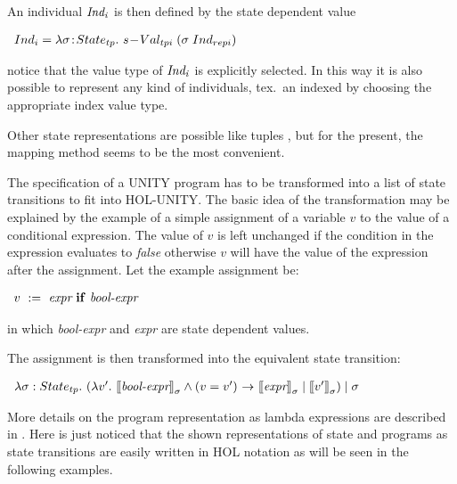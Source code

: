 An individual ${\it Ind_i}$ is then defined by the state dependent value

\vspace{2mm}
\centerline{\hbox{$ \it \begin{array}{l}
  Ind_i = \lambda \sigma\!:\!State_{tp}.\ s\!-\!Val_{tpi}\;(\sigma\;Ind_{repi})
\end{array} $}}
\vspace{1mm}

notice that the value type of ${\it Ind_{i}}$ is explicitly selected.  In this
way it is also possible to represent any kind of individuals, tex.\ an indexed
by choosing the appropriate index value type.

Other state representations are possible like tuples \cite{BA90}, but for the
present, the mapping method seems to be the most convenient.

The specification of a UNITY program has to be transformed into a list of state
transitions to fit into HOL-UNITY. The basic idea of the transformation may be
explained by the example of a simple assignment of a variable $v$ to the value
of a conditional expression.  The value of $v$ is left unchanged if the
condition in the expression evaluates to {\it false} otherwise $v$ will have
the value of the expression after the assignment.  Let the example assignment
be:

\vspace{2mm}
\centerline{\hbox{$ \it \begin{array}{l}
  v\ :=\ \mbox{\it expr}\ {\bf if}\ \mbox{\it bool-expr}
\end{array} $}}
\vspace{1mm}

in which \mbox{\it bool-expr} and \mbox{\it expr} are state dependent values.

The assignment is then transformed into the equivalent state transition:

\vspace{2mm}
\centerline{\hbox{$ \it \begin{array}{l}
  \lambda \sigma:State_{tp}.\
      (\lambda v'.\ \Ls \mbox{\it bool-expr} \Rs_\sigma \wedge (v = v')\ \Cn\
            \Ls \mbox{\it expr} \Rs_\sigma \mid \Ls v' \Rs_\sigma) \mid \sigma
\end{array} $}}
\vspace{1mm}

More details on the program representation as lambda expressions are described
in \cite{FA92}.  Here is just noticed that the shown representations of state
and programs as state transitions are easily written in HOL notation as will be
seen in the following examples.


